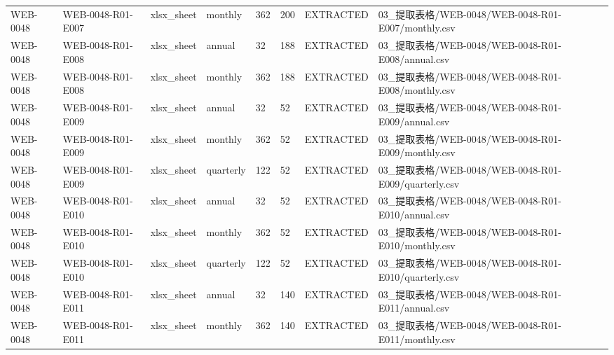 \begin{landscape}
\begin{longtable}{p{1.8cm}p{2.2cm}p{3.1cm}p{4.7cm}p{1.3cm}p{1.3cm}p{3.0cm}p{5.3cm}}
WEB-0048 & WEB-0048-R01-E007 & xlsx\_\allowbreak{}sheet & monthly & 362 & 200 & EXTRACTED & 03\_\allowbreak{}提取表格/\allowbreak{}WEB-0048/\allowbreak{}WEB-0048-R01-E007/\allowbreak{}monthly.csv\\
WEB-0048 & WEB-0048-R01-E008 & xlsx\_\allowbreak{}sheet & annual & 32 & 188 & EXTRACTED & 03\_\allowbreak{}提取表格/\allowbreak{}WEB-0048/\allowbreak{}WEB-0048-R01-E008/\allowbreak{}annual.csv\\
WEB-0048 & WEB-0048-R01-E008 & xlsx\_\allowbreak{}sheet & monthly & 362 & 188 & EXTRACTED & 03\_\allowbreak{}提取表格/\allowbreak{}WEB-0048/\allowbreak{}WEB-0048-R01-E008/\allowbreak{}monthly.csv\\
WEB-0048 & WEB-0048-R01-E009 & xlsx\_\allowbreak{}sheet & annual & 32 & 52 & EXTRACTED & 03\_\allowbreak{}提取表格/\allowbreak{}WEB-0048/\allowbreak{}WEB-0048-R01-E009/\allowbreak{}annual.csv\\
WEB-0048 & WEB-0048-R01-E009 & xlsx\_\allowbreak{}sheet & monthly & 362 & 52 & EXTRACTED & 03\_\allowbreak{}提取表格/\allowbreak{}WEB-0048/\allowbreak{}WEB-0048-R01-E009/\allowbreak{}monthly.csv\\
WEB-0048 & WEB-0048-R01-E009 & xlsx\_\allowbreak{}sheet & quarterly & 122 & 52 & EXTRACTED & 03\_\allowbreak{}提取表格/\allowbreak{}WEB-0048/\allowbreak{}WEB-0048-R01-E009/\allowbreak{}quarterly.csv\\
WEB-0048 & WEB-0048-R01-E010 & xlsx\_\allowbreak{}sheet & annual & 32 & 52 & EXTRACTED & 03\_\allowbreak{}提取表格/\allowbreak{}WEB-0048/\allowbreak{}WEB-0048-R01-E010/\allowbreak{}annual.csv\\
WEB-0048 & WEB-0048-R01-E010 & xlsx\_\allowbreak{}sheet & monthly & 362 & 52 & EXTRACTED & 03\_\allowbreak{}提取表格/\allowbreak{}WEB-0048/\allowbreak{}WEB-0048-R01-E010/\allowbreak{}monthly.csv\\
WEB-0048 & WEB-0048-R01-E010 & xlsx\_\allowbreak{}sheet & quarterly & 122 & 52 & EXTRACTED & 03\_\allowbreak{}提取表格/\allowbreak{}WEB-0048/\allowbreak{}WEB-0048-R01-E010/\allowbreak{}quarterly.csv\\
WEB-0048 & WEB-0048-R01-E011 & xlsx\_\allowbreak{}sheet & annual & 32 & 140 & EXTRACTED & 03\_\allowbreak{}提取表格/\allowbreak{}WEB-0048/\allowbreak{}WEB-0048-R01-E011/\allowbreak{}annual.csv\\
WEB-0048 & WEB-0048-R01-E011 & xlsx\_\allowbreak{}sheet & monthly & 362 & 140 & EXTRACTED & 03\_\allowbreak{}提取表格/\allowbreak{}WEB-0048/\allowbreak{}WEB-0048-R01-E011/\allowbreak{}monthly.csv\\

\end{longtable}
\end{landscape}
